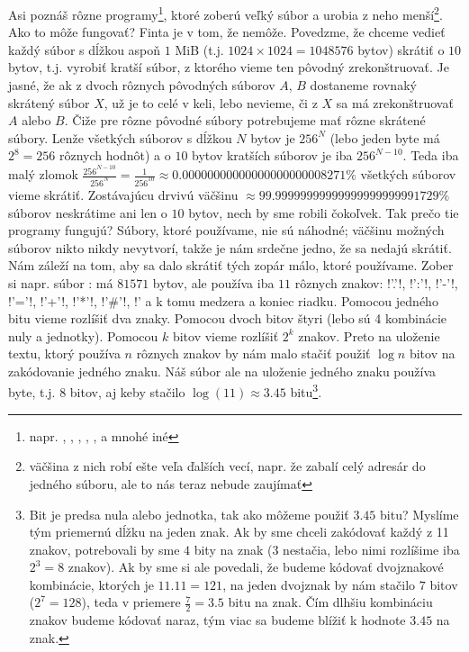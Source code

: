 Asi poznáš rôzne programy\footnote{napr. , , , ,
,  a mnohé iné}, ktoré zoberú veľký súbor a urobia z neho 
menší\footnote{väčšina z nich robí ešte veľa ďalších vecí, napr. že zabalí celý adresár
do jedného súboru, ale to nás teraz nebude zaujímať}. Ako to môže fungovať? Finta je v tom,
že nemôže. Povedzme, že chceme vedieť každý súbor s dĺžkou aspoň $1$ MiB (t.j. 
$1024\times1024=1048576$ bytov) skrátiť o $10$ bytov, t.j. vyrobiť kratší súbor, z ktorého
vieme ten pôvodný zrekonštruovať. Je jasné, že ak z dvoch rôznych pôvodných súborov $A$, $B$
dostaneme rovnaký skrátený súbor $X$, už je to celé v keli, lebo nevieme, či z $X$ sa má
zrekonštruovať $A$ alebo $B$. Čiže pre rôzne pôvodné súbory potrebujeme mať rôzne skrátené
súbory. Lenže všetkých súborov s dĺžkou $N$ bytov je $256^N$ (lebo jeden byte má $2^8=256$ 
rôznych hodnôt) a o $10$ bytov kratších súborov je iba $256^{N-10}$. Teda iba malý
zlomok $\frac{256^{N-10}}{256^N}=\frac{1}{256^{10}}\approx0.00000000000000000000008271\%$ 
všetkých
súborov vieme skrátiť. Zostávajúcu drvivú väčšinu 
\hbox{$\approx99.99999999999999999999991729\%$}
súborov neskrátime ani len o $10$ bytov, nech by sme robili čokoľvek.
Tak prečo tie programy fungujú? Súbory, ktoré používame, nie sú náhodné; väčšinu možných
súborov nikto nikdy nevytvorí, takže je nám srdečne jedno, že sa nedajú skrátiť. Nám záleží
na tom,
aby sa dalo skrátiť tých zopár málo, ktoré používame. 
Zober si napr. súbor 
: 
má $81571$ bytov, ale používa 
iba $11$ rôznych znakov:  \prg!'.'!, \prg!':'!, \prg!'-'!, \prg!'='!, \prg!'+'!,
\prg!'*'!, \prg!'#'!, \prg!'%
a k tomu medzera a koniec riadku. 
Pomocou jedného bitu vieme rozlíšiť dva znaky. Pomocou dvoch bitov štyri (lebo sú 4 kombinácie nuly a jednotky). Pomocou $k$
bitov vieme rozlíšiť $2^k$ znakov. Preto na uloženie textu, ktorý používa  $n$ rôznych znakov  by nám malo stačiť použiť $\log n$ bitov na zakódovanie jedného znaku.
Náš súbor ale na uloženie jedného znaku používa byte, t.j. 8 bitov,
aj keby stačilo $\log(11)\approx 3.45$ bitu\footnote{%
  Bit je predsa nula alebo jednotka, tak ako môžeme použiť $3.45$ bitu? Myslíme
  tým priemernú dĺžku na jeden znak. Ak by sme chceli zakódovať každý z 11 znakov, 
  potrebovali by sme $4$ bity na znak ($3$ nestačia, lebo nimi rozlíšime iba $2^3=8$ znakov). Ak by sme si ale povedali, že budeme
  kódovať dvojznakové kombinácie, ktorých je $11.11=121$, na jeden dvojznak by nám
  stačilo $7$ bitov ($2^7=128$), teda v priemere $\frac{7}{2}=3.5$ bitu na znak.
 Čím dlhšiu kombináciu
  znakov budeme kódovať naraz, tým viac sa budeme blížiť k hodnote $3.45$ na znak.
  }.
